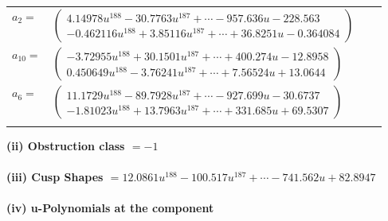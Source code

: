 \documentclass[1p]{elsarticle_modified}
\theoremstyle{definition}
\begin{document}
\begin{tabular}{m{7pt} m{180pt} m{7pt} m{180pt} }
\flushright $a_{2}=$&$\begin{pmatrix}4.14978 u^{188}-30.7763 u^{187}+\cdots-957.636 u-228.563\\-0.462116 u^{188}+3.85116 u^{187}+\cdots+36.8251 u-0.364084\end{pmatrix}$ \\
\flushright $a_{10}=$&$\begin{pmatrix}-3.72955 u^{188}+30.1501 u^{187}+\cdots+400.274 u-12.8958\\0.450649 u^{188}-3.76241 u^{187}+\cdots+7.56524 u+13.0644\end{pmatrix}$ \\
\flushright $a_{6}=$&$\begin{pmatrix}11.1729 u^{188}-89.7928 u^{187}+\cdots-927.699 u-30.6737\\-1.81023 u^{188}+13.7963 u^{187}+\cdots+331.685 u+69.5307\end{pmatrix}$\\&\end{tabular}
\flushleft \textbf{(ii) Obstruction class $= -1$}\\~\\
\flushleft \textbf{(iii) Cusp Shapes $= 12.0861 u^{188}-100.517 u^{187}+\cdots-741.562 u+82.8947$}\\~\\
\newpage\renewcommand{\arraystretch}{1}
\flushleft \textbf{(iv) u-Polynomials at the component}\newline \\
\end{document}
